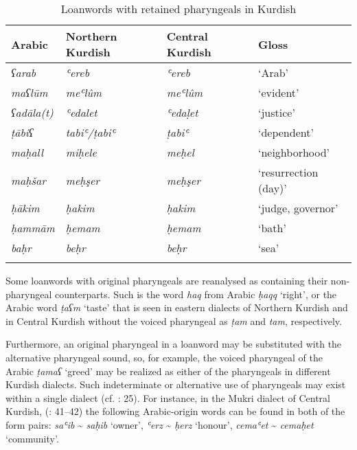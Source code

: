 \documentclass[output=paper]{langsci/langscibook}
\begin{document}
\begin{table}
\begin{tabular}{llll}
\lsptoprule
{Arabic} & {Northern Kurdish} & {Central Kurdish} & {Gloss}\\\midrule
\textit{ʕarab}     & \textit{ʿereb}        & \textit{ʿereb}                    & ‘Arab’\\
\textit{maʕlūm}    & \textit{meʿlûm}       & \textit{meʿlûm}    & ‘evident’\\
\textit{ʕadāla(t)} & \textit{ʿedalet}      & \textit{ʿedaḷet}                  & ‘justice’\\
\textit{ṭābiʕ}     & \textit{tabiʿ/ṭabiʿ}  & \textit{ṭabiʿ}                    & ‘dependent’\\
\textit{maḥall}    & \textit{miḥele}       & \textit{meḥel}                    & ‘neighborhood’\\
\textit{maḥšar}    & \textit{meḥşer}       & \textit{meḥşer}                   & ‘resurrection (day)’\\
\textit{ḥākim}     & \textit{ḥakim}        & \textit{ḥakim}                    & ‘judge, governor’\\
\textit{ḥammām}    & \textit{ḥemam}        & \textit{ḥemam}                    & ‘bath’\\
\textit{baḥr}      & \textit{beḥr}         & \textit{beḥr}                     & ‘sea’\\
\lspbottomrule
\end{tabular}
\caption{\label{bkm:Ref14691447}Loanwords with retained pharyngeals in Kurdish}
\label{tab:opengin:3}
\end{table}

Some loanwords with original pharyngeals are reanalysed as containing their non-pharyngeal counterparts. Such is the word \textit{haq} from Arabic \textit{ḥaqq} ‘right’, or the Arabic word \textit{ṭaʕm} ‘taste’ that is seen in eastern dialects of Northern Kurdish and in Central Kurdish without the voiced pharyngeal as \textit{ṭam} and \textit{tam}, respectively. 

Furthermore, an original pharyngeal in a loanword may be substituted with the alternative pharyngeal sound, so, for example, the voiced pharyngeal of the Arabic \textit{ṭamaʕ} ‘greed’ may be realized as either of the pharyngeals in different Kurdish dialects. Such indeterminate or alternative use of pharyngeals may exist within a single dialect (cf. \citealt{Kahn1976}: 25). For instance, in the Mukri dialect of Central Kurdish, (\citealt{Öpengin2016}: 41–42) the following Arabic-origin words can be found in both of the form pairs: \textit{saʿib} {\textasciitilde} \textit{saḥib} ‘owner’, \textit{ʿerz} {\textasciitilde} \textit{ḥerz} ‘honour’, \textit{cemaʿet} {\textasciitilde} \textit{cemaḥet} ‘community’. 
\end{document}
